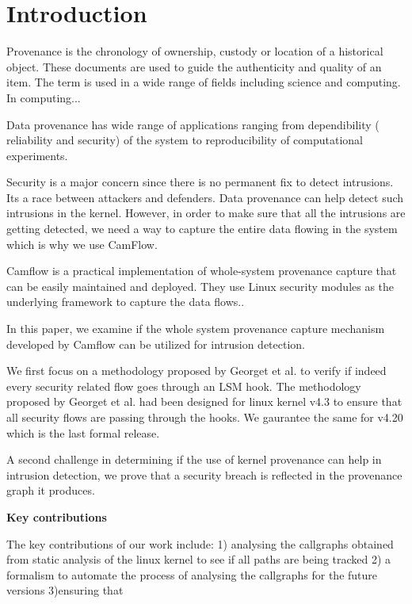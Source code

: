 \section{Introduction}
\label{What is provenance im general and with respect to computing?}

Provenance is the chronology of ownership, custody or location of a historical object. These documents are used to guide the authenticity and quality of an item. The term is used in a wide range of fields including science and computing. In computing...
\vskip 0.1in
\label{Applications of data provenance}

Data provenance has wide range of applications ranging from dependibility ( reliability and security) of the system to reproducibility of computational experiments.
\vskip 0.1in
\label{Role of data povenance in security}

Security is a major concern since there is no permanent fix to detect intrusions. Its a race between attackers and defenders. Data provenance can help detect such intrusions in the kernel. However, in order to make sure that all the intrusions are getting detected, we need a way to capture the entire data flowing in the system which is why we use CamFlow. 
\vskip 0.1in
\label{Camflow and whole system provenance and LSMs}

Camflow is a practical implementation of whole-system provenance capture that can be easily maintained and deployed. They use Linux security modules as the underlying framework to capture the data flows.. 


\label{What are we doing?}
In this paper, we examine if the whole system provenance capture mechanism developed by Camflow can be utilized for intrusion detection. 
\vskip 0.1in
\label{Challenge 1}

We first focus on a methodology proposed by Georget et al. to verify if indeed every security related flow goes through an LSM hook. The methodology proposed by Georget et al. had been designed for linux kernel v4.3 to ensure that all security flows are passing through the hooks. We gaurantee the same for v4.20 which is the last formal release. 
\vskip 0.1in
\label{Challenge 2}

A second challenge in determining if the use of kernel provenance can help in intrusion detection, we prove that a security breach is reflected in the provenance graph it produces. 
\vskip 0.1in

\textbf{Key contributions}

The key contributions of our work include: 1) analysing the callgraphs obtained from static analysis of the linux kernel to see if all paths are being tracked 2) a formalism to automate the process of analysing the callgraphs for the future versions 3)ensuring that 

